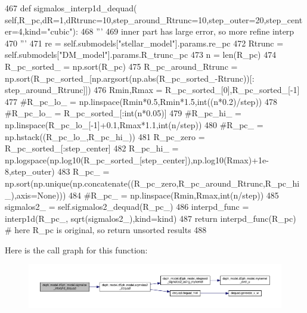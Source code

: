 \begin{DoxyCode}
467     \textcolor{keyword}{def }sigmalos\_interp1d\_dequad(
      self,R\_pc,dR=1,dRtrunc=10,step\_around\_Rtrunc=10,step\_outer=20,step\_center=4,kind="cubic"):
468         \textcolor{stringliteral}{'''}
469 \textcolor{stringliteral}{        inner part has large error, so more refine interp}
470 \textcolor{stringliteral}{        '''}
471         re = self.submodels[\textcolor{stringliteral}{"stellar\_model"}].params.re\_pc
472         Rtrunc = self.submodels[\textcolor{stringliteral}{"DM\_model"}].params.R\_trunc\_pc
473         n = len(R\_pc)
474         R\_pc\_sorted\_ = np.sort(R\_pc)
475         R\_pc\_around\_Rtrunc = np.sort(R\_pc\_sorted\_[np.argsort(np.abs(R\_pc\_sorted\_-Rtrunc))[:
      step\_around\_Rtrunc]])
476         Rmin,Rmax = R\_pc\_sorted\_[0],R\_pc\_sorted\_[-1]
477         \textcolor{comment}{#R\_pc\_lo\_ = np.linspace(Rmin*0.5,Rmin*1.5,int((n*0.2)/step))}
478         \textcolor{comment}{#R\_pc\_lo\_ = R\_pc\_sorted\_[:int(n*0.05)]}
479         \textcolor{comment}{#R\_pc\_hi\_ = np.linspace(R\_pc\_lo\_[-1]+0.1,Rmax*1.1,int(n/step))}
480         \textcolor{comment}{#R\_pc\_ = np.hstack((R\_pc\_lo\_,R\_pc\_hi\_))}
481         R\_pc\_zero = R\_pc\_sorted\_[:step\_center]
482         R\_pc\_hi\_ = np.logspace(np.log10(R\_pc\_sorted\_[step\_center]),np.log10(Rmax)+1e-8,step\_outer)
483         R\_pc\_ = np.sort(np.unique(np.concatenate((R\_pc\_zero,R\_pc\_around\_Rtrunc,R\_pc\_hi\_),axis=\textcolor{keywordtype}{None})))
484         \textcolor{comment}{#R\_pc\_ = np.linspace(Rmin,Rmax,int(n/step))}
485         sigmalos2\_ = self.sigmalos2\_dequad(R\_pc\_)
486         interpd\_func = interp1d(R\_pc\_, sqrt(sigmalos2\_),kind=kind)
487         \textcolor{keywordflow}{return} interpd\_func(R\_pc) \textcolor{comment}{# here R\_pc is original, so return unsorted results}
488     
\end{DoxyCode}
Here is the call graph for this function\+:
\nopagebreak
\begin{figure}[H]
\begin{center}
\leavevmode
\includegraphics[width=350pt]{d0/d25/classdsph__model_1_1dSph__model_a239ec859750c30fe31b6c19e94cd2e33_cgraph}
\end{center}
\end{figure}
\mbox{\label{classdsph__model_1_1dSph__model_a1c6185c02a3f58951b7ed9b75a348f49}} 

